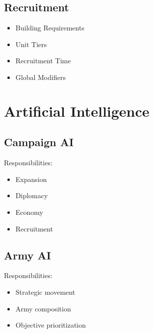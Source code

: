 \documentclass[11pt,a4paper]{article}
\begin{document}
\subsection{Recruitment}

\begin{itemize}

    \item Building Requirements

    \item Unit Tiers

    \item Recruitment Time

    \item Global Modifiers

\end{itemize}

\section{Artificial Intelligence}

\subsection{Campaign AI}

Responsibilities:

\begin{itemize}

    \item Expansion

    \item Diplomacy

    \item Economy

    \item Recruitment

\end{itemize}

\subsection{Army AI}

Responsibilities:

\begin{itemize}

    \item Strategic movement

    \item Army composition

    \item Objective prioritization

\end{itemize}
\end{document}
